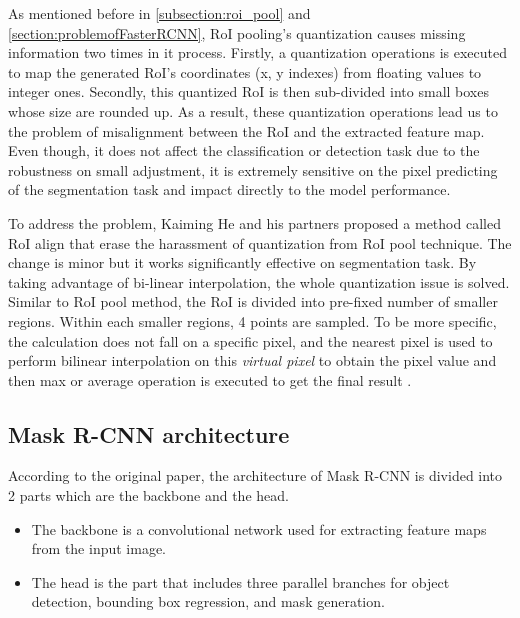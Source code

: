 	As mentioned before in \ref{subsection:roi_pool} and \ref{section:problemofFasterRCNN}, RoI pooling's quantization causes missing information two times in it process. Firstly, a quantization operations is executed to map the generated RoI's coordinates (x, y indexes) from floating values to integer ones. Secondly, this quantized RoI is then sub-divided into small boxes whose size are rounded up. As a result, these quantization operations lead us to the problem of misalignment between the RoI and the extracted feature map. Even though, it does not affect the classification or detection task due to the robustness on small adjustment, it is extremely sensitive on the pixel predicting of the segmentation task and impact directly to the model performance.
	
	To address the problem, Kaiming He and his partners proposed a method called RoI align that erase the harassment of quantization from RoI pool technique. The change is minor but it works significantly effective on segmentation task. By taking advantage of bi-linear interpolation, the whole quantization issue is solved. Similar to RoI pool method, the RoI is divided into pre-fixed number of smaller regions. Within each smaller regions, 4 points are sampled. To be more specific, the calculation does not fall on a specific pixel, and the nearest pixel is used to perform bilinear interpolation on this \textit{virtual pixel} to obtain the pixel value and then max or average operation is executed to get the final result \cite{maskrcnn}.

\subsection{Mask R-CNN architecture}
\label{subsection:architecture}
\noindent

	According to the original paper, the architecture of Mask R-CNN is divided into 2 parts which are the backbone and the head.	
	\begin{itemize}
		\item The backbone is a convolutional network used for extracting feature maps from the input image. 
		\item The head is the part that includes three parallel branches for object detection, bounding box regression, and mask generation.
	\end{itemize}
	
